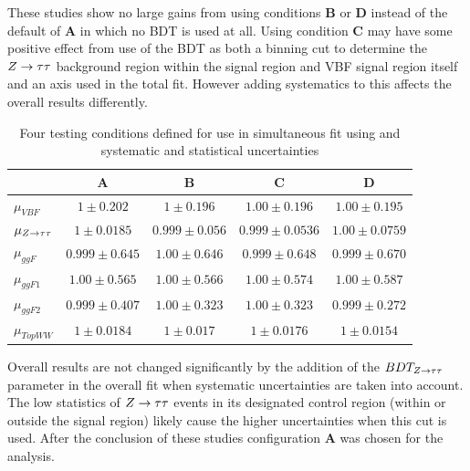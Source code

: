 These studies show no large gains from using conditions \textbf{B} or \textbf{D} instead of the default of \textbf{A} in which no BDT is used at all. Using condition \textbf{C} may have some positive effect from use of the BDT as both a binning cut to determine the $Z\rightarrow\tau\tau$ background region within the signal region and VBF signal region itself and an axis used in the total fit. However adding systematics to this affects the overall results differently.  

\begin{table}[h!]
\centering
\begin{tabular}{|l|c|c|c|c|}
\hline
     & \textbf{A}   & \textbf{B} & \textbf{C} & \textbf{D}     \\
\hline
$\mu_{VBF}$ & $1 \pm 0.202$ &  $1 \pm 0.196$ & $1.00 \pm 0.196$ & $1.00 \pm 0.195$\\
$\mu_{Z\rightarrow\tau\tau}$ & $1 \pm 0.0185$ & $0.999 \pm 0.056$ & $0.999 \pm 0.0536$ & $1.00\pm 0.0759$\\
$\mu_{ggF}$ & $0.999 \pm 0.645$ & $1.00 \pm 0.646$ & $0.999 \pm 0.648$ & $0.999 \pm 0.670$\\
$\mu_{ggF1}$ & $1.00 \pm 0.565$ & $1.00 \pm 0.566$ & $1.00 \pm 0.574$ & $1.00 \pm 0.587$\\
$\mu_{ggF2}$ & $0.999 \pm 0.407$ & $1.00 \pm 0.323$ & $1.00 \pm 0.323$ & $0.999 \pm 0.272$\\
$\mu_{TopWW}$ & $1 \pm 0.0184$ & $1 \pm 0.017$ & $1 \pm 0.0176$ & $1 \pm 0.0154$ \\
\hline
\end{tabular}
\caption{Four testing conditions defined for use in simultaneous fit using and systematic and statistical uncertainties}
\label{tab:ZBDTstatsys}
\end{table}

Overall results are not changed significantly by the addition of the $BDT_{Z\rightarrow\tau\tau}$ parameter in the overall fit when systematic uncertainties are taken into account. The low statistics of $Z\rightarrow\tau\tau$ events in its designated control region (within or outside the signal region) likely cause the higher uncertainties when this cut is used. After the conclusion of these studies configuration \textbf{A} was chosen for the analysis. 

